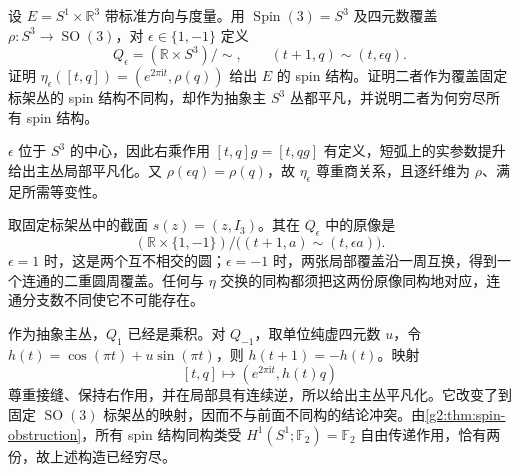 \begin{exercise}\label{g2:ex:two-spin-lifts-circle}
	设 \(E=S^1\times\mathbb R^3\) 带标准方向与度量。用 \(\operatorname{Spin}(3)=S^3\) 及四元数覆盖 \(\rho:S^3\to\operatorname{SO}(3)\)，对 \(\epsilon\in\{1,-1\}\) 定义
	\[
		Q_\epsilon=(\mathbb R\times S^3)/\!\sim,
		\qquad(t+1,q)\sim(t,\epsilon q).
	\]
	证明 \(\eta_\epsilon([t,q])=(e^{2\pi\mathrm i t},\rho(q))\) 给出 \(E\) 的 spin 结构。证明二者作为覆盖固定标架丛的 spin 结构不同构，却作为抽象主 \(S^3\) 丛都平凡，并说明二者为何穷尽所有 spin 结构。
\end{exercise}
\begin{solution}
	\(\epsilon\) 位于 \(S^3\) 的中心，因此右乘作用 \([t,q]g=[t,qg]\) 有定义，短弧上的实参数提升给出主丛局部平凡化。又 \(\rho(\epsilon q)=\rho(q)\)，故 \(\eta_\epsilon\) 尊重商关系，且逐纤维为 \(\rho\)、满足所需等变性。

	取固定标架丛中的截面 \(s(z)=(z,I_3)\)。其在 \(Q_\epsilon\) 中的原像是
	\[
		(\mathbb R\times\{1,-1\})/\bigl((t+1,a)\sim(t,\epsilon a)\bigr).
	\]
	\(\epsilon=1\) 时，这是两个互不相交的圆；\(\epsilon=-1\) 时，两张局部覆盖沿一周互换，得到一个连通的二重圆周覆盖。任何与 \(\eta\) 交换的同构都须把这两份原像同构地对应，连通分支数不同使它不可能存在。

	作为抽象主丛，\(Q_1\) 已经是乘积。对 \(Q_{-1}\)，取单位纯虚四元数 \(u\)，令 \(h(t)=\cos(\pi t)+u\sin(\pi t)\)，则 \(h(t+1)=-h(t)\)。映射
	\[
		[t,q]\longmapsto(e^{2\pi\mathrm i t},h(t)q)
	\]
	尊重接缝、保持右作用，并在局部具有连续逆，所以给出主丛平凡化。它改变了到固定 \(\operatorname{SO}(3)\) 标架丛的映射，因而不与前面不同构的结论冲突。由\cref{g2:thm:spin-obstruction}，所有 spin 结构同构类受 \(H^1(S^1;\mathbb F_2)=\mathbb F_2\) 自由传递作用，恰有两份，故上述构造已经穷尽。
\end{solution}

